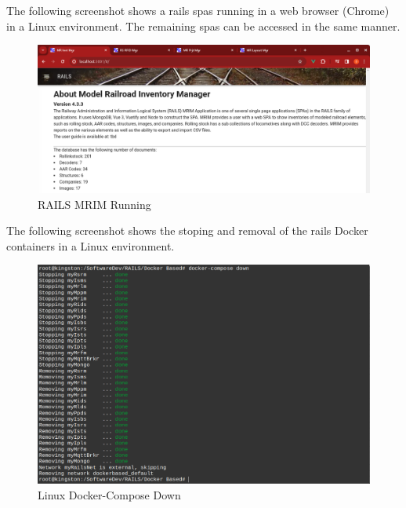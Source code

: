 The following screenshot shows a \gls{rails} \glspl{spa} running in a web browser (Chrome) in a Linux environment. The remaining \glspl{spa} can be accessed in the same manner.
\begin{figure}[H]
    \centering
    \includegraphics[scale=0.36]{mriml.png}
    \caption{RAILS MRIM Running}
    \label{fig:rails-mrim}
\end{figure}
The following screenshot shows the stoping and removal of the \gls{rails} Docker containers in a Linux environment.
\begin{figure}[H]
    \centering
    \includegraphics[scale=0.44]{win4l.png}
    \caption{Linux Docker-Compose Down}
    \label{fig:linux-docker-cmds-4}
\end{figure}
